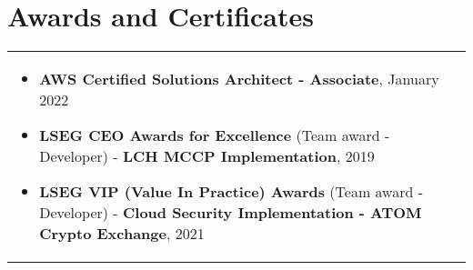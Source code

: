 \documentclass[a4paper,8pt]{article}
\begin{document}
\section{Awards and Certificates}
\begin{tabularx}{\linewidth}{ @{}l r@{} }
  \begin{minipage}[t]{\linewidth}
    \begin{itemize}[nosep,after=\strut, leftmargin=2em, itemsep=2pt]
      \item \textbf{AWS Certified Solutions Architect - Associate}, January 2022
      \item \textbf{LSEG CEO Awards for Excellence} (Team award - Developer) - \textbf{LCH MCCP Implementation}, 2019
      \item \textbf{LSEG VIP (Value In Practice) Awards} (Team award - Developer) - \textbf{Cloud Security Implementation - ATOM Crypto Exchange}, 2021
  \end{itemize}
\end{minipage}
\end{tabularx}
\end{document}
